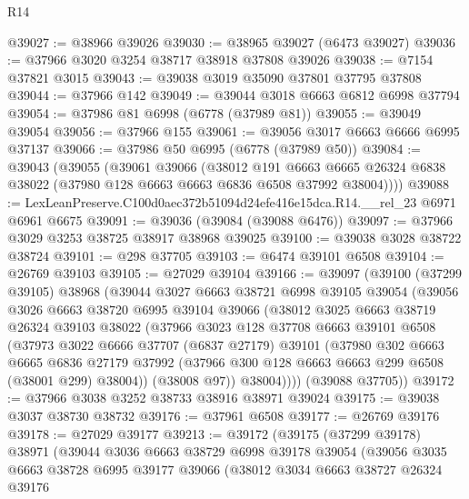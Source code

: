 \begin{lexlean}{R14}
\begin{coremodule}
@39027 := @38966 @39026
@39030 := @38965 @39027 (@6473 @39027)
@39036 := @37966 @3020 @3254 @38717 @38918 @37808 @39026
@39038 := @7154 @37821 @3015
@39043 := @39038 @3019 @35090 @37801 @37795 @37808
@39044 := @37966 @142
@39049 := @39044 @3018 @6663 @6812 @6998 @37794
@39054 := @37986 @81 @6998 (@6778 (@37989 @81))
@39055 := @39049 @39054
@39056 := @37966 @155
@39061 := @39056 @3017 @6663 @6666 @6995 @37137
@39066 := @37986 @50 @6995 (@6778 (@37989 @50))
@39084 := @39043
    (@39055
      (@39061
        @39066
        (@38012
          @191
          @6663
          @6665
          @26324
          @6838
          @38022
          (@37980 @128 @6663 @6663 @6836 @6508 @37992 @38004))))
@39088 := LexLeanPreserve.C100d0aec372b51094d24efe416e15dca.R14.__rel_23 @6971 @6961 @6675
@39091 := @39036 (@39084 (@39088 @6476))
@39097 := @37966 @3029 @3253 @38725 @38917 @38968 @39025
@39100 := @39038 @3028 @38722 @38724
@39101 := @298 @37705
@39103 := @6474 @39101 @6508
@39104 := @26769 @39103
@39105 := @27029 @39104
@39166 := @39097
    (@39100
      (@37299 @39105)
      @38968
      (@39044
        @3027
        @6663
        @38721
        @6998
        @39105
        @39054
        (@39056
          @3026
          @6663
          @38720
          @6995
          @39104
          @39066
          (@38012
            @3025
            @6663
            @38719
            @26324
            @39103
            @38022
            (@37966
              @3023
              @128
              @37708
              @6663
              @39101
              @6508
              (@37973
                @3022
                @6666
                @37707
                (@6837 @27179)
                @39101
                (@37980
                  @302
                  @6663
                  @6665
                  @6836
                  @27179
                  @37992
                  (@37966 @300 @128 @6663 @6663 @299 @6508 (@38001 @299) @38004))
                (@38008 @97))
              @38004))))
      (@39088 @37705))
@39172 := @37966 @3038 @3252 @38733 @38916 @38971 @39024
@39175 := @39038 @3037 @38730 @38732
@39176 := @37961 @6508
@39177 := @26769 @39176
@39178 := @27029 @39177
@39213 := @39172
    (@39175
      (@37299 @39178)
      @38971
      (@39044
        @3036
        @6663
        @38729
        @6998
        @39178
        @39054
        (@39056
          @3035
          @6663
          @38728
          @6995
          @39177
          @39066
          (@38012
            @3034
            @6663
            @38727
            @26324
            @39176

\end{coremodule}
\end{lexlean}
